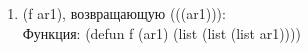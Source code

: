 \begin{enumerate}
\item (f ar1), возвращающую (((ar1))):\\
Функция: (defun f (ar1) (list (list (list ar1))))
\begin{figure}[ht!]
\end{figure}
\end{enumerate}



